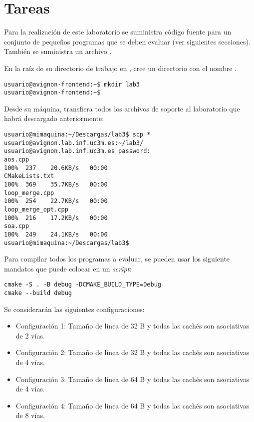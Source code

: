 \section{Tareas}

Para la realización de este laboratorio se suministra código fuente para un
conjunto de pequeños programas que se deben evaluar (ver siguientes secciones).
También se suministra un archivo .

En la raíz de su directorio de trabajo en , cree un
directorio con el nombre .

\begin{lstlisting}[style=terminal,aboveskip=1em,belowskip=1em]
usuario@avignon-frontend:~$ mkdir lab3
usuario@avignon-frontend:~$
\end{lstlisting}

Desde su máquina, transfiera todos los archivos de soporte al laboratorio
que habrá descargado anteriormente:

\begin{lstlisting}[style=terminal,aboveskip=1em,belowskip=1em]
usuario@mimaquina:~/Descargas/lab3$ scp * usuario@avignon.lab.inf.uc3m.es:~/lab3/
usuario@avignon.lab.inf.uc3m.es password: 
aos.cpp                                                            100%  237    20.6KB/s   00:00    
CMakeLists.txt                                                     100%  369    35.7KB/s   00:00    
loop_merge.cpp                                                     100%  254    22.7KB/s   00:00    
loop_merge_opt.cpp                                                 100%  216    17.2KB/s   00:00    
soa.cpp                                                            100%  249    24.1KB/s   00:00    
usuario@mimaquina:~/Descargas/lab3$ 
\end{lstlisting}

Para compilar todos los programas a evaluar, se pueden usar los siguiente mandatos
que puede colocar en un \emph{script}:

\begin{lstlisting}[style=terminal,aboveskip=1em,belowskip=1em]
cmake -S . -B debug -DCMAKE_BUILD_TYPE=Debug
cmake --build debug
\end{lstlisting}

Se considerarán las siguientes configuraciones:
\begin{itemize}
\item Configuración 1:
Tamaño de línea de 32 B y todas las cachés son asociativas de 2 vías.
\item Configuración 2:
Tamaño de línea de 32 B y todas las cachés son asociativas de 4 vías.
\item Configuración 3:
Tamaño de línea de 64 B y todas las cachés son asociativas de 4 vías.
\item Configuración 4:
Tamaño de línea de 64 B y todas las cachés son asociativas de 8 vías.
\end{itemize}



